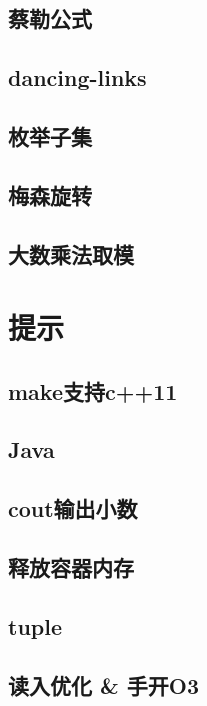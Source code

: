 \documentclass[titlepage,a4paper,10pt]{article}
\begin{document}
\begin{multicols}{2}
\begin{spacing}{0.8}
			\subsection{蔡勒公式}
				
			\subsection{dancing-links}
				
			\subsection{枚举子集}
				
			\subsection{梅森旋转}
				
			\subsection{大数乘法取模}
				
			
		\section{提示}
			\subsection{make支持c++11}
				
			\subsection{Java}
				
			\subsection{cout输出小数}
				
			\subsection{释放容器内存}
				
			\subsection{tuple}
				
			\subsection{读入优化 \& 手开O3}
				

\end{spacing}
\end{multicols}
\end{document}
